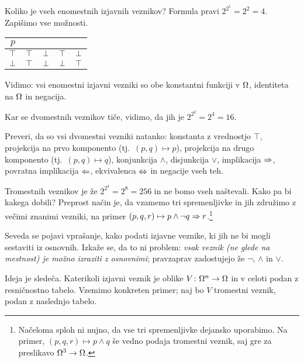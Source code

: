                 Koliko je vseh enomestnih izjavnih veznikov? Formula pravi $2^{2^1} = 2^2 = 4$. Zapišimo vse možnosti.

                \begin{center}
                        \begin{tabular}{c|cccc}
                                $p$ &&&& \\
                                \hline
                                $\top$ & $\top$ & $\bot$ & $\top$ & $\bot$ \\
                                $\bot$ & $\top$ & $\bot$ & $\bot$ & $\top$
                        \end{tabular}
                \end{center}

                Vidimo: vsi enomestni izjavni vezniki so obe konstantni funkciji v $\Omega$, identiteta na $\Omega$ in negacija.

                Kar se dvomestnih veznikov tiče, vidimo, da jih je $2^{2^2} = 2^4 = 16$.

                \begin{vaja}
                        Preveri, da so vsi dvomestni vezniki natanko: konstanta z vrednostjo $\top$, projekcija na prvo komponento (tj.~$(p, q) \mapsto p$), projekcija na drugo komponento (tj.~$(p, q) \mapsto q$), konjunkcija $\land$, disjunkcija $\lor$, implikacija $\Rightarrow$, povratna implikacija $\Leftarrow$, ekvivalenca $\Leftrightarrow$ in negacije vseh teh.
                \end{vaja}

                Tromestnih veznikov je že $2^{2^3} = 2^8 = 256$ in ne bomo vseh naštevali. Kako pa bi kakega dobili? Preprost način je, da vzamemo tri spremenljivke in jih združimo z večimi znanimi vezniki, na primer $(p, q, r) \mapsto p \land \lnot{q} \Rightarrow r$.\footnote{Načeloma sploh ni nujno, da vse tri spremenljivke dejansko uporabimo. Na primer, $(p, q, r) \mapsto p \land q$ še vedno podaja tromestni veznik, saj gre za preslikavo $\Omega^3 \to \Omega$.}

                Seveda se pojavi vprašanje, kako podati izjavne veznike, ki jih ne bi mogli sestaviti iz osnovnih. Izkaže se, da to ni problem: \emph{vsak veznik (ne glede na mestnost) je možno izraziti z osnovnimi}; pravzaprav zadostujejo že $\lnot$, $\land$ in $\lor$.

                Ideja je sledeča. Katerikoli izjavni veznik je oblike $V\colon \Omega^n \to \Omega$ in v celoti podan z resničnostno tabelo. Vzemimo konkreten primer; naj bo $V$ tromestni veznik, podan z naslednjo tabelo.

